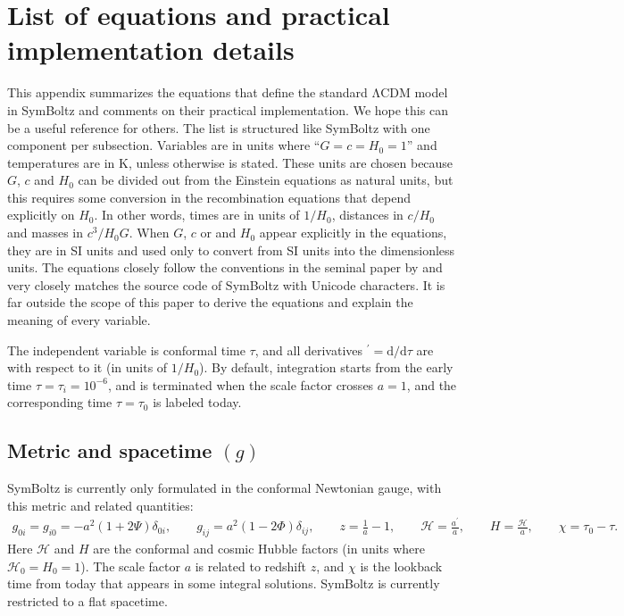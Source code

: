 \documentclass{aa}
\newcommand{\LCDM}{$\mathrm{\Lambda C D M}$}
\newcommand\scrH{\mathscr{H}}
\begin{document}



\appendix
\onecolumn

\section{List of equations and practical implementation details}
\label{sec:implementation}

This appendix summarizes the equations that define the standard \LCDM{} model in SymBoltz and comments on their practical implementation.
We hope this can be a useful reference for others.
The list is structured like SymBoltz with one component per subsection.
Variables are in units where \enquote{$G = c = H_0 = 1$} and temperatures are in $\mathrm{K}$, unless otherwise is stated.
These units are chosen because $G$, $c$ and $H_0$ can be divided out from the Einstein equations as natural units, but this requires some conversion in the recombination equations that depend explicitly on $H_0$.
In other words, times are in units of $1/H_0$, distances in $c/H_0$ and masses in $c^3/H_0 G$.
When $G$, $c$ or and $H_0$ appear explicitly in the equations, they are in SI units and used only to convert from SI units into the dimensionless units.
The equations closely follow the conventions in the seminal paper by \cite{maCosmologicalPerturbationTheory1995} and very closely matches the source code of SymBoltz with Unicode characters.
It is far outside the scope of this paper to derive the equations and explain the meaning of every variable.

The independent variable is conformal time $\tau$, and all derivatives ${}^\prime = \mathrm{d} / \mathrm{d}\tau$ are with respect to it (in units of $1/H_0$).
By default, integration starts from the early time $\tau = \tau_i = 10^{-6}$, and is terminated when the scale factor crosses $a = 1$, and the corresponding time $\tau = \tau_0$ is labeled today.

\subsection{Metric and spacetime \texorpdfstring{$(g)$}{(g)}}
\label{sec:metric}
SymBoltz is currently only formulated in the conformal Newtonian gauge, with this metric and related quantities:
\begin{align*}
    g_{0i} = g_{i0} = -a^2 (1+2\Psi) \delta_{0i}, \qquad
    g_{ij} = a^2 (1-2\Phi) \delta_{ij}, \qquad
    z = \frac{1}{a} - 1, \qquad
    \scrH = \frac{a^\prime}{a}, \qquad
    H = \frac{\scrH}{a} , \qquad
    \chi = \tau_0 - \tau .
\end{align*}
Here $\scrH$ and $H$ are the conformal and cosmic Hubble factors (in units where $\scrH_0 = H_0 = 1$).
The scale factor $a$ is related to redshift $z$, and $\chi$ is the lookback time from today that appears in some integral solutions.
SymBoltz is currently restricted to a flat spacetime.
\end{document}
